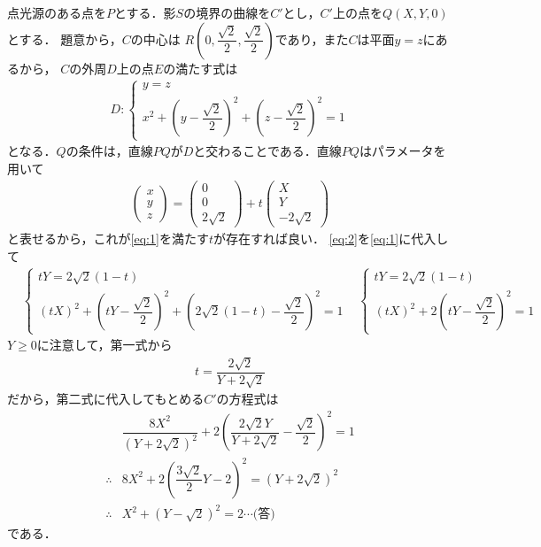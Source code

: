 \documentclass[../../main.tex]{subfiles}
\begin{document}
点光源のある点を$P$とする．影$S$の境界の曲線を$C'$とし，$C'$上の点を$Q(X,Y,0)$とする．
題意から，$C$の中心は
$R\left(0,\dfrac{\sqrt{2}}{2},\dfrac{\sqrt{2}}{2}\right)$であり，また$C$は平面$y=z$にあるから，
$C$の外周$D$上の点$E$の満たす式は
\begin{align}
  D:
  \begin{cases}
    y=z \\
    x^2+\left(y-\dfrac{\sqrt{2}}{2}\right)^2 + \left(z-\dfrac{\sqrt{2}}{2}\right)^2 = 1
  \end{cases} \label{eq:1}
\end{align}
となる．$Q$の条件は，直線$PQ$が$D$と交わることである．直線$PQ$はパラメータを用いて
\begin{align}
  \begin{pmatrix}x\\y\\z
  \end{pmatrix}=
  \begin{pmatrix}0\\0\\2\sqrt{2}
  \end{pmatrix}+t
  \begin{pmatrix}X\\Y\\-2\sqrt{2}
  \end{pmatrix} \label{eq:2}
\end{align}
と表せるから，これが\cref{eq:1}を満たす$t$が存在すれば良い．
\cref{eq:2}を\cref{eq:1}に代入して
\begin{align}
  &
  \begin{cases}
    tY=2\sqrt{2}(1-t)  \\
    (tX)^2+\left(tY-\dfrac{\sqrt{2}}{2}\right)^2+\left(2\sqrt{2}(1-t)-\dfrac{\sqrt{2}}{2}\right)^2=1　
  \end{cases}
  &
  \begin{cases}
    tY=2\sqrt{2}(1-t)  \\
    (tX)^2+2\left(tY-\dfrac{\sqrt{2}}{2}\right)^2=1　
  \end{cases} \label{eq:3}
\end{align}
$Y \ge 0$に注意して，第一式から
\begin{align}
  t = \dfrac{2\sqrt{2}}{Y+2\sqrt{2}}
\end{align}
だから，第二式に代入してもとめる$C'$の方程式は
\begin{align}
  &\dfrac{8X^2}{(Y+2\sqrt{2})^2}+2\left(\dfrac{2\sqrt{2}Y}{Y+2\sqrt{2}}-\dfrac{\sqrt{2}}{2}\right)^2=1 \\
  \therefore&8X^2+2\left(\dfrac{3\sqrt{2}}{2}Y-2\right)^2=(Y+2\sqrt{2})^2 \\
  \therefore&X^2+(Y-\sqrt{2})^2=2\cdots\text{(答)}
\end{align}
である．
\end{document}
